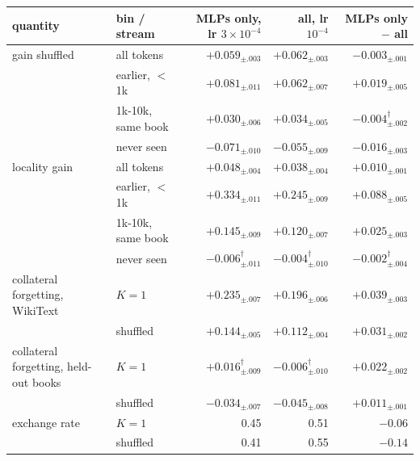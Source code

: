 \begin{tabular}{llrrr}
\toprule
quantity & bin / stream & MLPs only, lr $3\!\times\!10^{-4}$ & all, lr $10^{-4}$ & MLPs only $-$ all \\
\midrule
gain shuffled & all tokens & $+0.059_{\pm .003}$ & $+0.062_{\pm .003}$ & $-0.003_{\pm .001}$ \\
 & earlier, $<$ 1k & $+0.081_{\pm .011}$ & $+0.062_{\pm .007}$ & $+0.019_{\pm .005}$ \\
 & 1k-10k, same book & $+0.030_{\pm .006}$ & $+0.034_{\pm .005}$ & $-0.004_{\pm .002}^{\dagger}$ \\
 & never seen & $-0.071_{\pm .010}$ & $-0.055_{\pm .009}$ & $-0.016_{\pm .003}$ \\
locality gain & all tokens & $+0.048_{\pm .004}$ & $+0.038_{\pm .004}$ & $+0.010_{\pm .001}$ \\
 & earlier, $<$ 1k & $+0.334_{\pm .011}$ & $+0.245_{\pm .009}$ & $+0.088_{\pm .005}$ \\
 & 1k-10k, same book & $+0.145_{\pm .009}$ & $+0.120_{\pm .007}$ & $+0.025_{\pm .003}$ \\
 & never seen & $-0.006_{\pm .011}^{\dagger}$ & $-0.004_{\pm .010}^{\dagger}$ & $-0.002_{\pm .004}^{\dagger}$ \\
collateral forgetting, WikiText & $K=1$ & $+0.235_{\pm .007}$ & $+0.196_{\pm .006}$ & $+0.039_{\pm .003}$ \\
 & shuffled & $+0.144_{\pm .005}$ & $+0.112_{\pm .004}$ & $+0.031_{\pm .002}$ \\
collateral forgetting, held-out books & $K=1$ & $+0.016_{\pm .009}^{\dagger}$ & $-0.006_{\pm .010}^{\dagger}$ & $+0.022_{\pm .002}$ \\
 & shuffled & $-0.034_{\pm .007}$ & $-0.045_{\pm .008}$ & $+0.011_{\pm .001}$ \\
exchange rate & $K=1$ & 0.45 & 0.51 & $-0.06$ \\
 & shuffled & 0.41 & 0.55 & $-0.14$ \\
\bottomrule
\end{tabular}

